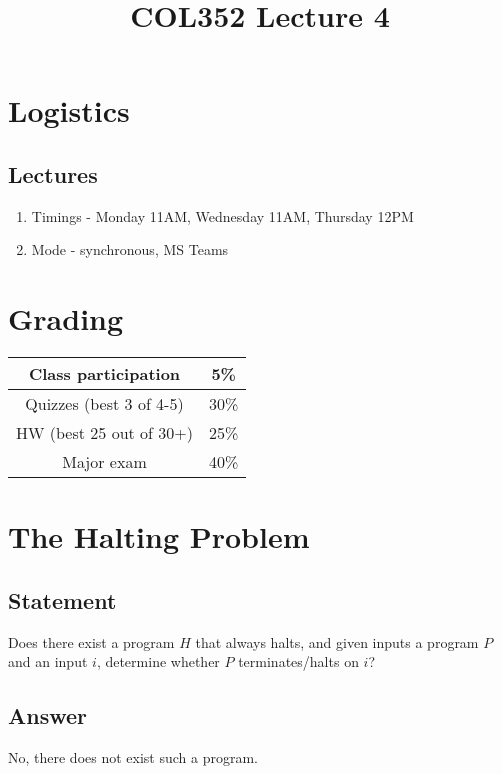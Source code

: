 \documentclass[a4paper]{article}
\title{\textbf{COL352 Lecture 4}}
\date{}
\begin{document}
\maketitle
\tableofcontents

\iffalse

\section{Logistics}
\subsection{Lectures}
\begin{enumerate}
    \item Timings - Monday 11AM, Wednesday 11AM, Thursday 12PM
    \item Mode - synchronous, MS Teams
\end{enumerate}
\section{Grading}
\begin{center}
\begin{tabular}{|c|c|}
    \hline
    Class participation     &  5\% \\
    \hline
    Quizzes (best 3 of 4-5) & 30\% \\
    \hline
    HW (best 25 out of 30+) & 25\% \\
    \hline
    Major exam	            & 40\% \\
    \hline
\end{tabular}
\end{center}
\section{The Halting Problem}
\subsection{Statement}
Does there exist a program $H$ that always halts, and given inputs a program $P$ and an input $i$, determine whether $P$ terminates/halts on $i$?
\subsection{Answer}
No, there does not exist such a program.
\end{document}
